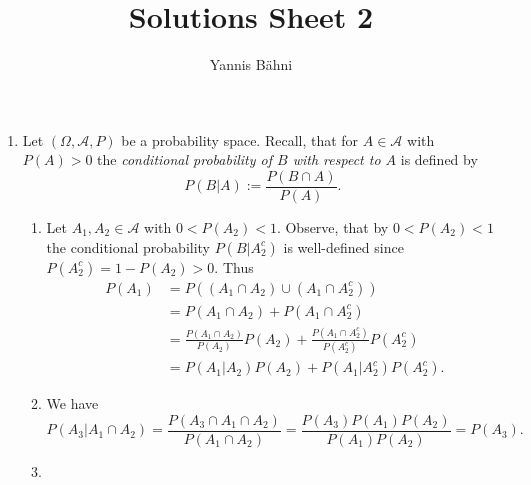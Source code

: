 

\title{Solutions Sheet 2}
\author{Yannis B\"{a}hni}
\address[Yannis B\"{a}hni]{University of Zurich, R\"{a}mistrasse 71, 8006 Zurich}


\maketitle
\thispagestyle{fancy}
\begin{enumerate}[label = \textbf{Exercise \arabic*.},wide = 0pt, itemsep=1.5ex]
	\item Let $(\Omega,\mathcal{A},P)$ be a probability space. Recall, that for $A \in \mathcal{A}$ with $P(A) > 0$ the \emph{conditional probability of $B$ with respect to $A$} is defined by
		\begin{equation}
			P(B \vert A) := \frac{P(B \cap A)}{P(A)}.
		\end{equation}
		\begin{enumerate}[label = \arabic*.,wide = 0pt, itemsep=1.5ex]
			\item Let $A_1,A_2 \in \mathcal{A}$ with $0 < P(A_2) < 1$. Observe, that by $0 < P(A_2) < 1$ the conditional probability $P(B\vert A_2^c)$ is well-defined since $P(A_2^c) = 1 - P(A_2) > 0$. Thus
				\begin{align*}
					P(A_1) &= P((A_1 \cap A_2) \cup (A_1 \cap A_2^c))\\
					&= P(A_1 \cap A_2) + P(A_1 \cap A_2^c)\\
					&= \frac{P(A_1 \cap A_2)}{P(A_2)}P(A_2) + \frac{P(A_1 \cap A_2^c)}{P(A_2^c)}P(A_2^c)\\
					&= P(A_1 \vert A_2)P(A_2) + P(A_1 \vert A_2^c)P(A_2^c).
				\end{align*}

			\item We have 
				\begin{equation*}
					P(A_3 \vert A_1 \cap A_2) = \frac{P(A_3 \cap A_1 \cap A_2)}{P(A_1 \cap A_2)} = \frac{P(A_3)P(A_1)P(A_2)}{P(A_1)P(A_2)} = P(A_3).
				\end{equation*}

			\item
		\end{enumerate}
\end{enumerate}

